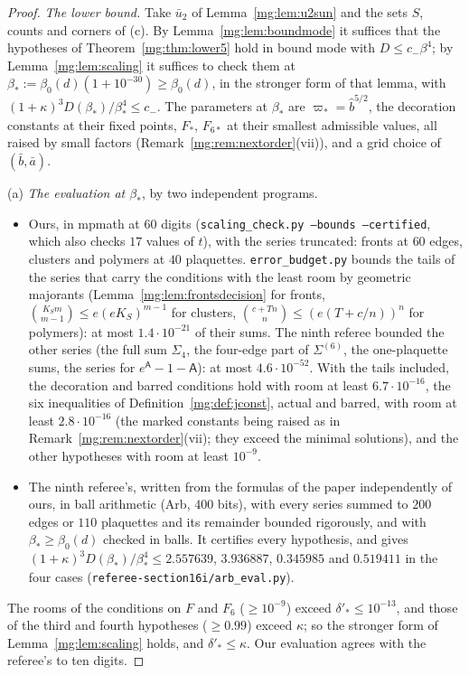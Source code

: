 \documentclass[11pt,a4paper]{article}
\theoremstyle{definition}
\theoremstyle{remark}
\begin{document}
\begin{proof}
\emph{The lower bound.} Take $\bar u_2$ of Lemma~\ref{mg:lem:u2sun} and the sets $S$, counts and corners of (c). By Lemma~\ref{mg:lem:boundmode} it suffices that the hypotheses of
Theorem~\ref{mg:thm:lower5} hold in bound mode with $D\le c_-\beta^4$; by Lemma~\ref{mg:lem:scaling} it suffices to check them at $\beta_*:=\beta_0(d)(1+10^{-30})\ge\beta_0(d)$, in the stronger
form of that lemma, with $(1+\kappa)^3D(\beta_*)/\beta_*^4\le c_-$. The parameters at $\beta_*$ are $\varpi_*=\hat b^{5/2}$, the decoration constants at their fixed points, $F_*$, $F_{6*}$ at their
smallest admissible values, all raised by small factors (Remark~\ref{mg:rem:nextorder}(vii)), and a grid choice of $(\bar b,\bar a)$.

(a) \emph{The evaluation at $\beta_*$}, by two independent programs.
\begin{itemize}
\item Ours, in mpmath at $60$ digits (\texttt{scaling\_check.py --bounds --certified}, which also checks $17$ values of $t$), with the series truncated: fronts at $60$ edges, clusters and polymers at
$40$ plaquettes. \texttt{error\_budget.py} bounds the tails of the series that carry the conditions with the least room by geometric majorants (Lemma~\ref{mg:lem:frontsdecision} for fronts,
$\binom{K_Sm}{m-1}\le e(eK_S)^{m-1}$ for clusters, $\binom{c+Tn}n\le(e(T+c/n))^n$ for polymers): at most $1.4\cdot10^{-21}$ of their sums. The ninth referee bounded the other series (the full sum
$\Sigma_4$, the four-edge part of $\Sigma^{(6)}$, the one-plaquette sums, the series for $e^{\mathsf A}-1-\mathsf A$): at most $4.6\cdot10^{-52}$. With the tails included, the decoration and barred
conditions hold with room at least $6.7\cdot10^{-16}$, the six inequalities of Definition~\ref{mg:def:jconst}, actual and barred, with room at least $2.8\cdot10^{-16}$ (the marked constants
being raised as in Remark~\ref{mg:rem:nextorder}(vii); they exceed the minimal solutions), and the other hypotheses with room at least $10^{-9}$.
\item The ninth referee's, written from the formulas of the paper independently of ours, in ball arithmetic (Arb, $400$ bits), with every series summed to $200$ edges or $110$ plaquettes and its
remainder bounded rigorously, and with $\beta_*\ge\beta_0(d)$ checked in balls. It certifies every hypothesis, and gives $(1+\kappa)^3D(\beta_*)/\beta_*^4\le2.557639$, $3.936887$, $0.345985$ and
$0.519411$ in the four cases (\texttt{referee-section16i/\allowbreak arb\_eval.py}).
\end{itemize}
The rooms of the conditions on $F$ and $F_6$ ($\ge10^{-9}$) exceed $\delta'_*\le10^{-13}$, and those of the third and fourth hypotheses ($\ge0.99$) exceed $\kappa$; so the stronger form of
Lemma~\ref{mg:lem:scaling} holds, and $\delta'_*\le\kappa$. Our evaluation agrees with the referee's to ten digits.


\end{proof}
\end{document}
